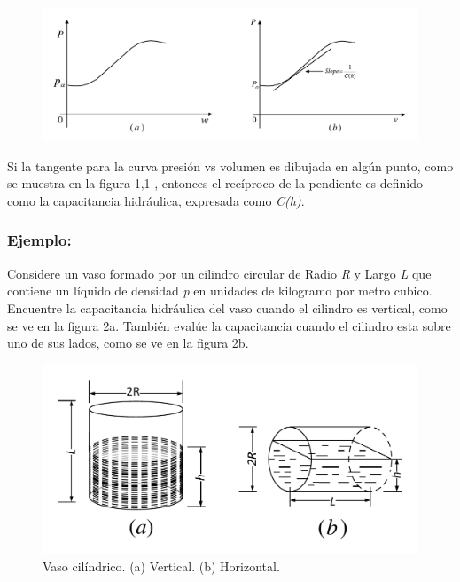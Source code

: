 \documentclass[a4paper,12pt,twoside]{proyectotanquesecci}
\begin{document}
\begin{figure}[h]
\centering
\includegraphics[scale=0.4]{Figura1}
\renewcommand{\figurename}{Fig.}
\label{Presi�n en funci�n del volumen y el �rea de un liquido}
\end{figure}

Si la tangente para la curva  presión vs volumen es dibujada en algún punto, como se muestra en la figura 1,1 , entonces el recíproco de la pendiente es definido como la capacitancia hidráulica, expresada como \textit{C(h)}.

\subsubsection{Ejemplo:}

Considere un vaso formado por un cilindro circular de Radio \textit{R} y Largo \textit{L} que contiene un líquido de densidad \textit{p} en unidades de kilogramo por metro cubico.
Encuentre la capacitancia hidráulica del vaso cuando el cilindro es vertical, como se ve en la figura 2a. También evalúe la capacitancia cuando el cilindro esta sobre uno de sus lados, como se ve en la figura 2b.

\begin{figure}[h]
\centering
\includegraphics[scale=0.4]{Figura2}
\renewcommand{\figurename}{Fig.}
\caption{Vaso cilíndrico. (a) Vertical. (b) Horizontal.}
\label{Vaso cilíndrico. (a) Cilindro vertical. (b) Cilindro horizontal.}
\end{figure}
\end{document}
